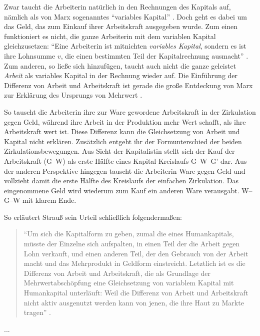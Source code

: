 \documentclass[12pt,
               DIV13,
               paper=a4,
               twoside=false,
               onehalfspacing,
               bibliography=totoc,
               toc=graduated,
               draft,
               ]{scrartcl}
\newcommand{\pc}[2]{\parencite[#1]{#2}}
\newcommand{\vgl}[2]{\parencite[vgl.][#1]{#2}}
\newcommand{\worries}[1]{\ifdraft{\textcolor{blue}{\texttt{(#1)}}}{}}
\newcommand{\gwg}{G--W--G'\xspace}
\newcommand{\wgw}{W--G--W\xspace}
\begin{document}
Zwar taucht die Arbeiterin natürlich in den Rechnungen des Kapitals
auf, nämlich als von Marx sogenanntes "`variables Kapital"'
\pc{224}{kap}. Doch geht es dabei um das Geld, das zum Einkauf ihrer
Arbeitskraft ausgegeben wurde. \worries{Stimmt das?} Zum einen funktioniert es
nicht, die ganze Arbeiterin mit dem variablen Kapital gleichzusetzen:
"`Eine Arbeiterin ist mitnichten \emph{variables Kapital}, sondern es
ist ihre Lohnsumme
$v$, die einen bestimmten Teil der Kapitalrechnung ausmacht"'
\pc{126}{strauss}. Zum anderen, so ließe sich hinzufügen, taucht auch
nicht die ganze geleistet \emph{Arbeit} als variables Kapital in der
Rechnung wieder auf. Die Einführung der Differenz von Arbeit und
Arbeitskraft ist gerade die große Entdeckung von Marx zur Erklärung
des Ursprungs von Mehrwert \vgl{xxx}{kap}.

So tauscht die Arbeiterin ihre zur Ware gewordene Arbeitskraft in der
Zirkulation gegen Geld, während ihre Arbeit in der Produktion mehr
Wert schafft, als ihre Arbeitskraft wert ist. Diese Differenz kann die
Gleichsetzung von Arbeit und Kapital nicht erklären. Zusätzlich
entgeht ihr der Formunterschied der beiden Zirkulationsbewegungen. Aus
Sicht der Kapitalistin stellt sich der Kauf der Arbeitskraft (G--W)
als erste Hälfte eines Kapital-Kreislaufs \gwg dar. Aus der anderen
Perspektive hingegen tauscht die Arbeiterin Ware gegen Geld und
vollzieht damit die erste Hälfte des Kreislaufs der einfachen
Zirkulation. Das eingenommene Geld wird wiederum zum Kauf ein anderen
Ware verausgabt. \wgw mit klarem Ende.

So erläutert Strauß sein Urteil schließlich folgendermaßen:

\begin{spacing}{1}
\begin{quote}
"`Um sich die Kapitalform zu geben, zumal die eines Humankapitals,
müsste der Einzelne sich aufspalten, in einen Teil der die Arbeit
gegen Lohn verkauft, und einen anderen Teil, der den Gebrauch von der
Arbeit macht und das Mehrprodukt in Geldform einstreicht.
Letztlich ist es die Differenz von Arbeit und Arbeitskraft, die als
Grundlage der Mehrwertabschöpfung eine Gleichsetzung von variablem
Kapital mit Humankapital unterläuft: Weil die Differenz von Arbeit und
Arbeitskraft nicht aktiv ausgenutzt werden kann von jenen, die ihre
Haut zu Markte tragen"' \pc{126}{strauss}.
\end{quote}
\end{spacing}

...
\end{document}
